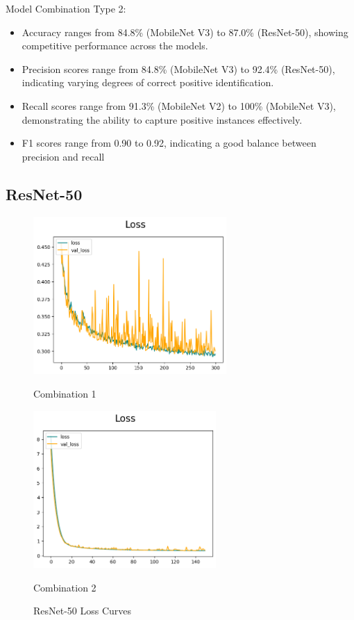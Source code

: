Model Combination Type 2:

\begin{itemize}
    \item Accuracy ranges from 84.8\% (MobileNet V3) to 87.0\% (ResNet-50), showing competitive performance across the models.
    \item Precision scores range from 84.8\% (MobileNet V3) to 92.4\% (ResNet-50), indicating varying degrees of correct positive identification.
    \item Recall scores range from 91.3\% (MobileNet V2) to 100\% (MobileNet V3), demonstrating the ability to capture positive instances effectively.
    \item F1 scores range from 0.90 to 0.92, indicating a good balance between precision and recall
\end{itemize}

\subsection{ResNet-50}

\begin{figure}[H]
    \centering
    \begin{minipage}[b]{0.49\textwidth}
        \centering
        \includegraphics[width=\textwidth, height=6cm]{Figures/unbalanced_data/without bn/resnet/loss.png}
        \captionsetup{labelformat=empty}
        \caption{Combination 1}
        \label{fig:u_wo_r_l}
    \end{minipage}
    \hfill
    \begin{minipage}[b]{0.49\textwidth}
        \centering
        \includegraphics[width=\textwidth, height=6cm]{Figures/unbalanced_data/with bn/resnet/loss.png}
        \captionsetup{labelformat=empty}
        \caption{Combination 2}
        \label{fig:u_w_r_l}
    \end{minipage}
    \captionsetup{labelformat=default}
    \caption{ResNet-50 Loss Curves}
\end{figure}


